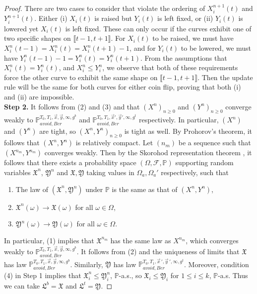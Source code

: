 \begin{proof}
	There are two cases to consider that violate the ordering of $X^{n+1}_i(t)$ and $Y^{n+1}_i(t)$. Either (i) $X_i(t)$ is raised but $Y_i(t)$ is left fixed, or (ii) $Y_i(t)$ is lowered yet $X_i(t)$ is left fixed. These can only occur if the curves exhibit one of two specific shapes on $\llbracket t-1, t+1\rrbracket$. For $X_i(t)$ to be raised, we must have $X^n_i(t-1) = X^n_i(t) = X^n_i(t+1) - 1$, and for $Y_i(t)$ to be lowered, we must have $Y^n_i(t-1) - 1 = Y^n_i(t) = Y^n_i(t+1)$. From the assumptions that $X^n_i(t) = Y^n_i(t)$, and $X^n_i \leq Y^n_i$, we observe that both of these requirements force the other curve to exhibit the same shape on $\llbracket t-1, t+1\rrbracket$. Then the update rule will be the same for both curves for either coin flip, proving that both (i) and (ii) are impossible. \\
	
	\noindent\textbf{Step 2.} It follows from (2) and (3) and \cite[Theorem 1.8.3]{Norris} that $(X^n)_{n\geq 0}$ and $(Y^n)_{n\geq 0}$ converge weakly to $\mathbb{P}_{avoid,Ber}^{T_0,T_1,\vec{x},\vec{y},\infty,g^b}$ and $\mathbb{P}_{avoid,Ber}^{T_0,T_1,\vec{x}',\vec{y}',\infty,g^t}$ respectively. In particular, $(X^n)$ and $(Y^n)$ are tight, so $(X^n,Y^n)_{n\geq 0}$ is tight as well. By Prohorov's theorem, it follows that $(X^n,Y^n)$ is relatively compact. Let $(n_m)$ be a sequence such that $(X^{n_m},Y^{n_m})$ converges weakly. Then by the Skorohod representation theorem \cite[Theorem 6.7]{Billing}, it follows that there exists a probability space $(\Omega,\mathcal{F},\mathbb{P})$ supporting random variables $\mathfrak{X}^n$, $\mathfrak{Y}^n$ and $\mathfrak{X},\mathfrak{Y}$ taking values in $\Omega_a,\Omega_a'$ respectively, such that
	\begin{enumerate}[label=(\arabic*)]
		
		\item The law of $(\mathfrak{X}^n,\mathfrak{Y}^n)$ under $\mathbb{P}$ is the same as that of $(X^n,Y^n)$,
		
		\item $\mathfrak{X}^n(\omega) \longrightarrow \mathfrak{X}(\omega)$ for all $\omega\in\Omega$,
		
		\item $\mathfrak{Y}^n(\omega) \longrightarrow \mathfrak{Y}(\omega)$ for all $\omega\in\Omega$.
		
	\end{enumerate}
	
	In particular, (1) implies that $\mathfrak{X}^{n_m}$ has the same law as $X^{n_m}$, which converges weakly to $\mathbb{P}_{avoid,Ber}^{T_0,T_1,\vec{x},\vec{y},\infty,g^b}$. It follows from (2) and the uniqueness of limits that $\mathfrak{X}$ has law $\mathbb{P}_{avoid,Ber}^{T_0,T_1,\vec{x},\vec{y},\infty,g^b}$. Similarly, $\mathfrak{Y}$ has law $\mathbb{P}_{avoid,Ber}^{T_0,T_1,\vec{x}\,',\vec{y}\,',\infty,g^t}$. Moreover, condition (4) in Step 1 implies that $\mathfrak{X}^n_i \leq \mathfrak{Y}^n_i$, $\mathbb{P}$-a.s., so $\mathfrak{X}_i \leq \mathfrak{Y}_i$ for $1\leq i\leq k$, $\mathbb{P}$-a.s. Thus we can take $\mathfrak{L}^b = \mathfrak{X}$ and $\mathfrak{L}^t = \mathfrak{Y}$.
	
\end{proof}
